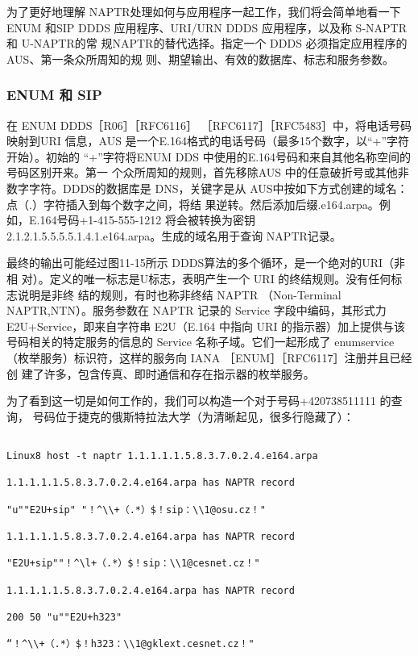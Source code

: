 为了更好地理解 NAPTR处理如何与应用程序一起工作，我们将会简单地看一下 ENUM
和SIP DDDS 应用程序、URI/URN DDDS 应用程序，以及称 S-NAPTR 和 U-NAPTR的常
规NAPTR的替代选择。指定一个 DDDS 必须指定应用程序的AUS、第一条众所周知的规
则、期望输出、有效的数据库、标志和服务参数。

\subsubsection{ENUM 和 SIP}

在 ENUM DDDS［R06］［RFC6116］ ［RFC6117］［RFC5483］中，将电话号码映射到URI
信息，AUS 是一个E.164格式的电话号码（最多15个数字，以“+”字符开始）。初始的
“+”字符将ENUM DDS 中使用的E.164号码和来自其他名称空间的号码区别开来。第一
个众所周知的规则，首先移除AUS 中的任意破折号或其他非数字字符。DDDS的数据库是
DNS，关键字是从 AUS中按如下方式创建的域名：点（.）字符插入到每个数字之间，将结
果逆转。然后添加后缀.e164.arpa。例如，E.164号码+1-415-555-1212 将会被转换为密钥
2.1.2.1.5.5.5.5.1.4.1.e164.arpa。生成的域名用于查询 NAPTR记录。

最终的输出可能经过图11-15所示 DDDS算法的多个循环，是一个绝对的URI（非相
对）。定义的唯一标志是U标志，表明产生一个 URI 的终结规则。没有任何标志说明是非终
结的规则，有时也称非终结 NAPTR （Non-Terminal NAPTR,NTN）。服务参数在 NAPTR
记录的 Service 字段中编码，其形式力 E2U+Service，即来自字符串 E2U（E.164 中指向 URI
的指示器）加上提供与该号码相关的特定服务的信息的 Service 名称子域。它们一起形成了
enumservice（枚举服务）标识符，这样的服务向 IANA ［ENUM］［RFC6117］注册并且已经创
建了许多，包含传真、即时通信和存在指示器的枚举服务。

为了看到这一切是如何工作的，我们可以构造一个对于号码+420738511111 的查询，
号码位于捷克的俄斯特拉法大学（为清晰起见，很多行隐藏了）：

\begin{verbatim}
    
Linux8 host -t naptr 1.1.1.1.1.5.8.3.7.0.2.4.e164.arpa

1.1.1.1.1.5.8.3.7.0.2.4.e164.arpa has NAPTR record

"u""E2U+sip" "！^\\+（.*）$！sip：\\1@osu.cz！"

1.1.1.1.1.5.8.3.7.0.2.4.e164.arpa has NAPTR record

"E2U+sip""！^\l+（.*）$！sip：\\1@cesnet.cz！"

1.1.1.1.1.5.8.3.7.0.2.4.e164.arpa has NAPTR record

200 50 "u""E2U+h323"

“！^\\+（.*）$！h323：\\1@gklext.cesnet.cz！"
\end{verbatim}

